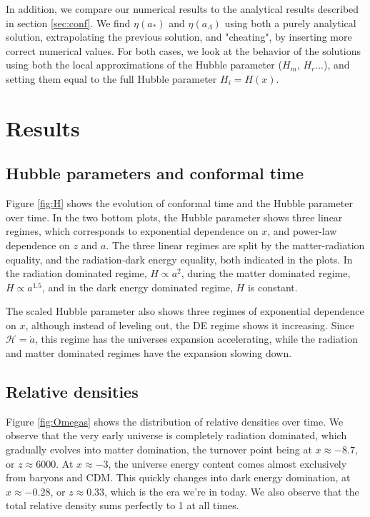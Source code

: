 \documentclass[10pt, a4paper]{article}
\begin{document}
In addition, we compare our numerical results to the analytical results described in section \ref{sec:conf}. We find $\eta(a_*)$ and $\eta(a_\Lambda)$ using both a purely analytical solution, extrapolating the previous solution, and "cheating", by inserting more correct numerical values. For both cases, we look at the behavior of the solutions using both the local approximations of the Hubble parameter ($H_m$, $H_r$...), and setting them equal to the full Hubble parameter $H_i = H(x)$.


\section{Results}
\subsection{Hubble parameters and conformal time}
Figure \ref{fig:H} shows the evolution of conformal time and the Hubble parameter over time. In the two bottom plots, the Hubble parameter shows three linear regimes, which corresponds to exponential dependence on $x$, and power-law dependence on $z$ and $a$. The three linear regimes are split by the matter-radiation equality, and the radiation-dark energy equality, both indicated in the plots. In the radiation dominated regime, $H \propto a^2$, during the matter dominated regime, $H \propto a^{1.5}$, and in the dark energy dominated regime, $H$ is constant.

The scaled Hubble parameter also shows three regimes of exponential dependence on $x$, although instead of leveling out, the DE regime shows it increasing. Since $\mathcal{H} = \dot{a}$, this regime has the universes expansion accelerating, while the radiation and matter dominated regimes have the expansion slowing down.

\subsection{Relative densities}
Figure \ref{fig:Omegas} shows the distribution of relative densities over time. We observe that the very early universe is completely radiation dominated, which gradually evolves into matter domination, the turnover point being at $x\approx-8.7$, or $z\approx 6000$. At $x\approx-3$, the universe energy content comes almost exclusively from baryons and CDM. This quickly changes into dark energy domination, at $x\approx -0.28$, or $z\approx 0.33$, which is the era we're in today. We also observe that the total relative density sums perfectly to 1 at all times.
\end{document}
